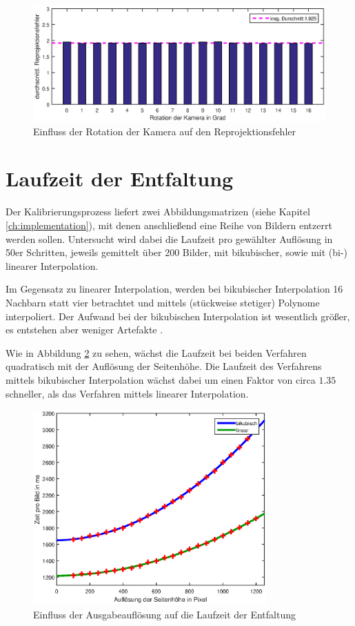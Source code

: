 \begin{figure}[!htb]
	\centering
	\includegraphics[width=\textwidth]{images/reprojectionErrorDeg3.eps}
	\caption{Einfluss der Rotation der Kamera auf den Reprojektionsfehler}
	\label{fig:influenceRot}
\end{figure}


\section{Laufzeit der Entfaltung}
Der Kalibrierungsprozess liefert zwei Abbildungsmatrizen (siehe Kapitel \ref{ch:implementation}), mit denen anschließend eine Reihe von Bildern entzerrt werden sollen. Untersucht wird dabei die Laufzeit pro gewählter Auflösung in 50er Schritten, jeweils gemittelt über 200 Bilder, mit bikubischer, sowie mit (bi-) linearer Interpolation.

Im Gegensatz zu linearer Interpolation, werden bei bikubischer Interpolation 16 Nachbarn statt vier betrachtet und mittels (stückweise stetiger) Polynome interpoliert. Der Aufwand bei der bikubischen Interpolation ist wesentlich größer, es entstehen aber weniger Artefakte \cite{Keys1981}.

Wie in Abbildung \ref{fig:influenceRes2} zu sehen, wächst die Laufzeit bei beiden Verfahren quadratisch mit der Auflösung der Seitenhöhe. Die Laufzeit des Verfahrens mittels bikubischer Interpolation wächst dabei um einen Faktor von circa $1.35$ schneller, als das Verfahren mittels linearer Interpolation.

\begin{figure}[!htb]
	\centering
	\includegraphics[width=0.8\textwidth]{images/runningTimePerSlantheight.eps}
	\caption{Einfluss der Ausgabeauflösung auf die Laufzeit der Entfaltung}
	\label{fig:influenceRes2}
\end{figure}

